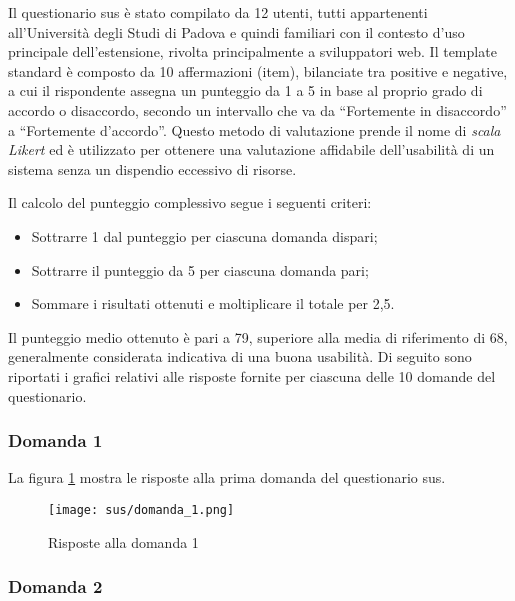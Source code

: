 Il questionario \gls{sus} è stato compilato da 12 utenti, tutti appartenenti all’Università degli Studi di Padova e quindi familiari con il contesto d’uso principale dell’estensione, rivolta principalmente a sviluppatori web. Il template standard è composto da 10 affermazioni (item), bilanciate tra positive e negative, a cui il rispondente assegna un punteggio da 1 a 5 in base al proprio grado di accordo o disaccordo, secondo un intervallo che va da “Fortemente in disaccordo” a “Fortemente d’accordo”. Questo metodo di valutazione prende il nome di \textit{scala Likert} ed è utilizzato per ottenere una valutazione affidabile dell’usabilità di un sistema senza un dispendio eccessivo di risorse.

\vspace{10pt}
\noindent Il calcolo del punteggio complessivo segue i seguenti criteri:
\begin{itemize}
  \item Sottrarre 1 dal punteggio per ciascuna domanda dispari;
  \item Sottrarre il punteggio da 5 per ciascuna domanda pari;
  \item Sommare i risultati ottenuti e moltiplicare il totale per 2,5. 
\end{itemize}

\vspace{5pt}
\noindent Il punteggio medio ottenuto è pari a 79, superiore alla media di riferimento di 68, generalmente considerata indicativa di una buona usabilità. Di seguito sono riportati i grafici relativi alle risposte fornite per ciascuna delle 10 domande del questionario.

\subsubsection*{Domanda 1}

\vspace{5pt}
\begin{minipage}{\textwidth}
  \noindent La figura \ref{fig:sus_q1} mostra le risposte alla prima domanda del questionario \gls{sus}.
  \begin{figure}[H]
    \centering
    \texttt{[image: sus/domanda\_1.png]}
    \caption{Risposte alla domanda 1}
    \label{fig:sus_q1}
  \end{figure}
\end{minipage}

\subsubsection*{Domanda 2}

